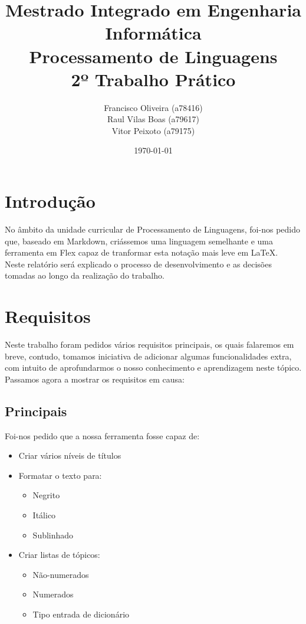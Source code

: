 \documentclass{report}
\title{\textbf{Mestrado Integrado em Engenharia Informática}\\\textbf{Processamento de Linguagens}\\ 2º Trabalho Prático}
\author{Francisco Oliveira (a78416)\\Raul Vilas Boas (a79617)\\Vitor Peixoto (a79175)}
\date{\today}
\begin{document}
\maketitle
\tableofcontents


\chapter{ Introdução
}
No âmbito da unidade curricular de Processamento de Linguagens, 
foi-nos pedido que, baseado em Markdown, 
criássemos uma linguagem semelhante e uma ferramenta em Flex 
capaz de tranformar esta notação mais leve em \LaTeX. 
\\
Neste relatório será explicado o processo de desenvolvimento 
e as decisões tomadas ao longo da realização do trabalho.

\chapter{ Requisitos
}
Neste trabalho foram pedidos vários requisitos principais, os quais falaremos em breve, 
contudo, tomamos iniciativa de adicionar algumas funcionalidades extra, com intuito 
de aprofundarmos o nosso conhecimento e aprendizagem neste tópico.
\\
Passamos agora a mostrar os requisitos em causa:

\section{ Principais
}
Foi-nos pedido que a nossa ferramenta fosse capaz de:
\begin{itemize}
\item  Criar vários níveis de títulos
\item  Formatar o texto para:
    \begin{itemize}
\item  Negrito
    \item  Itálico
    \item  Sublinhado
    \end{itemize}
\item  Criar listas de tópicos:
    \begin{itemize}
\item  Não-numerados
    \item  Numerados
    \item  Tipo entrada de dicionário 
    \end{itemize}
\end{itemize}
\end{document}
